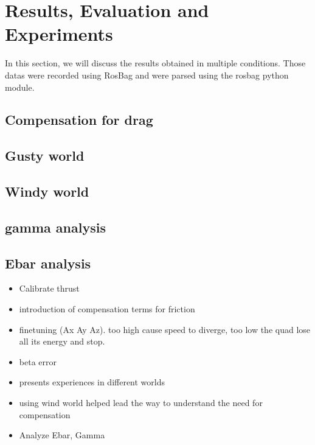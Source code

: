 \section{Results, Evaluation and Experiments}
In this section, we will discuss the results obtained in multiple conditions. Those datas were recorded using RosBag and were parsed using the rosbag python module.
\subsection{Compensation for drag}

\subsection{Gusty world}

\subsection{Windy world}

\subsection{gamma analysis}

\subsection{Ebar analysis}



 \begin{itemize}
    \item Calibrate thrust
    \item  introduction of compensation terms for friction
    \item finetuning (Ax Ay Az). too high cause speed to diverge, too low the quad lose all its energy and stop. 
    \item beta error
    \item presents experiences in different worlds
    \item using wind world helped lead the way to understand the need for compensation
    \item Analyze Ebar, Gamma
 \end{itemize}
